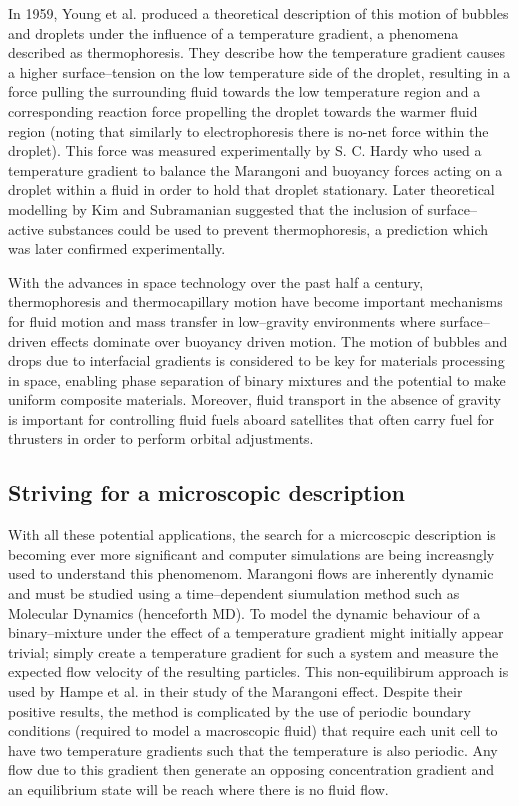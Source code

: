 In 1959, Young et al. produced a theoretical description of this motion of bubbles and droplets under the influence of a temperature gradient, a phenomena described as thermophoresis.\cite{Young1959}
They describe how the temperature gradient causes a higher surface--tension on the low temperature side of the droplet, resulting in a force pulling the surrounding fluid towards the low temperature region and a corresponding reaction force propelling the droplet towards the warmer fluid region (noting that similarly to electrophoresis there is no-net force within the droplet).
This force was measured experimentally by S. C. Hardy\cite{Hardy1978} who used a temperature gradient to balance the Marangoni and buoyancy forces acting on a droplet within a fluid in order to hold that droplet stationary.
Later theoretical modelling by Kim and Subramanian suggested that the inclusion of surface--active substances could be used to prevent thermophoresis,\cite{KimSubramanian} a prediction which was later confirmed experimentally.\cite{BartonSubramanian,ChenStebe}

With the advances in space technology over the past half a century, thermophoresis and thermocapillary motion have become important mechanisms for fluid motion and mass transfer in low--gravity environments where surface--driven effects dominate over buoyancy driven motion.
The motion of bubbles and drops due to interfacial gradients is considered to be key for materials processing in space, enabling phase separation of binary mixtures and the potential to make uniform composite materials.\cite{BartonSubramanian}
Moreover, fluid transport in the absence of gravity is important for controlling fluid fuels aboard satellites that often carry fuel for thrusters in order to perform orbital adjustments.\cite{MotionOfBubblesAndDrops} 

\subsection{Striving for a microscopic description}
With all these potential applications, the search for a micrcoscpic description is becoming ever more significant and computer simulations are being increasngly used to understand this phenomenom.
Marangoni flows are inherently dynamic and must be studied using a time--dependent siumulation method such as Molecular Dynamics (henceforth MD).
To model the dynamic behaviour of a binary--mixture under the effect of a temperature gradient might initially appear trivial; simply create a temperature gradient for such a system and measure the expected flow velocity of the resulting particles.
This non-equilibirum approach is used by Hampe et al. in their study of the Marangoni effect.\cite{HolgerBoppHampe}
Despite their positive results, the method is complicated by the use of periodic boundary conditions (required to model a macroscopic fluid) that require each unit cell to have two temperature gradients such that the temperature is also periodic.
Any flow due to this gradient then generate an opposing concentration gradient and an equilibrium state will be reach where there is no fluid flow.

